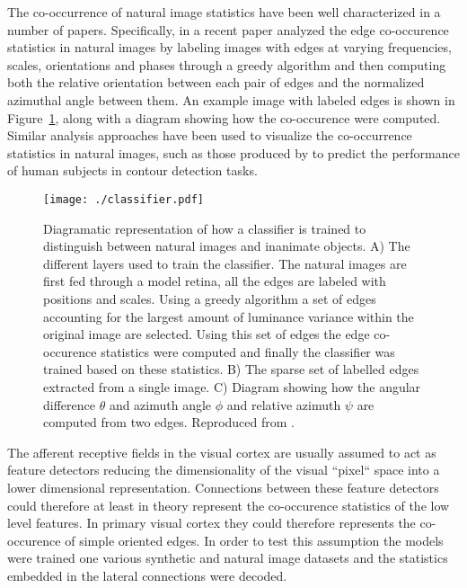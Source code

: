 The co-occurrence of natural image statistics have been well
characterized in a number of papers. Specifically, in a recent paper
\cite{Perrinet2015} analyzed the edge co-occurence statistics in
natural images by labeling images with edges at varying frequencies,
scales, orientations and phases through a greedy algorithm and then
computing both the relative orientation between each pair of edges and
the normalized azimuthal angle between them. An example image with
labeled edges is shown in Figure~\ref{classifier}, along with a
diagram showing how the co-occurence were computed. Similar analysis
approaches have been used to visualize the co-occurrence statistics in
natural images, such as those produced by \cite{Geisler2001} to
predict the performance of human subjects in contour detection tasks.

\begin{figure}
	\centering
    \texttt{[image: ./classifier.pdf]}
	\caption[] {Diagramatic representation of how a classifier is
      trained to distinguish between natural images and inanimate
      objects. A) The different layers used to train the
      classifier. The natural images are first fed through a model
      retina, all the edges are labeled with positions and
      scales. Using a greedy algorithm a set of edges accounting for
      the largest amount of luminance variance within the original
      image are selected. Using this set of edges the edge
      co-occurence statistics were computed and finally the classifier
      was trained based on these statistics. B) The sparse set
      of labelled edges extracted from a single image. C) Diagram
      showing how the angular difference $\theta$ and azimuth angle
      $\phi$ and relative azimuth $\psi$ are computed from two
      edges. Reproduced from \cite{Perrinet2015}.}
	\label{classifier}
\end{figure}

The afferent receptive fields in the visual cortex are usually assumed
to act as feature detectors reducing the dimensionality of the visual
``pixel`` space into a lower dimensional representation. Connections
between these feature detectors could therefore at least in theory
represent the co-occurence statistics of the low level features. In
primary visual cortex they could therefore represents the co-occurence
of simple oriented edges. In order to test this assumption the models
were trained one various synthetic and natural image datasets and the
statistics embedded in the lateral connections were decoded.

